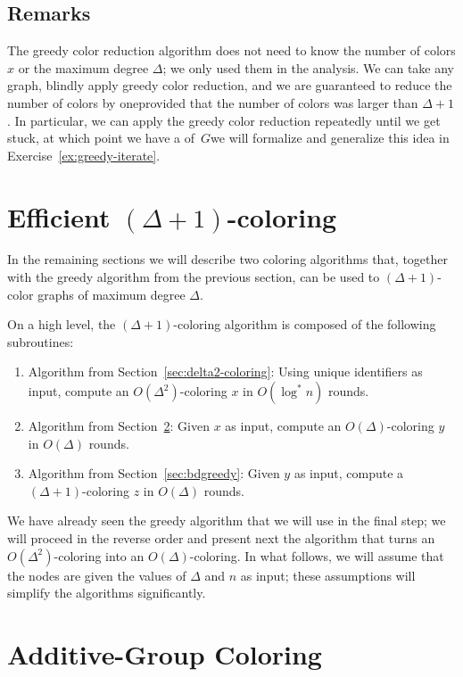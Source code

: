 \subsection{Remarks}

The greedy color reduction algorithm does not need to know the number of colors $x$ or the maximum degree $\Delta$; we only used them in the analysis. We can take any graph, blindly apply greedy color reduction, and we are guaranteed to reduce the number of colors by one\mydash provided that the number of colors was larger than $\Delta + 1$. In particular, we can apply the greedy color reduction repeatedly until we get stuck, at which point we have a \Dpocol{} of~$G$\mydash we will formalize and generalize this idea in Exercise~\ref{ex:greedy-iterate}.

\section[{Efficient \texorpdfstring{$(\Delta+1)$}{(Δ+1)}-coloring}]{\boldmath Efficient $(\Delta+1)$-coloring}

In the remaining sections we will describe two coloring algorithms that, together with the greedy algorithm from the previous section, can be used to $(\Delta+1)$-color graphs of maximum degree $\Delta$.

On a high level, the $(\Delta+1)$-coloring algorithm is composed of the following subroutines:
\begin{enumerate}
  \item Algorithm from Section~\ref{sec:delta2-coloring}: Using unique identifiers as input, compute an $O(\Delta^2)$-coloring $x$ in $O(\log^* n)$ rounds.
  \item Algorithm from Section~\ref{sec:additive-group-col}: Given $x$ as input, compute an $O(\Delta)$-coloring $y$ in $O(\Delta)$ rounds.
  \item Algorithm from Section~\ref{sec:bdgreedy}: Given $y$ as input, compute a $(\Delta+1)$-coloring $z$ in $O(\Delta)$ rounds.
\end{enumerate}
We have already seen the greedy algorithm that we will use in the final step; we will proceed in the reverse order and present next the algorithm that turns an $O(\Delta^2)$-coloring into an $O(\Delta)$-coloring. In what follows, we will assume that the nodes are given the values of $\Delta$ and $n$ as input; these assumptions will simplify the algorithms significantly.

\section{Additive-Group Coloring} \label{sec:additive-group-col}

